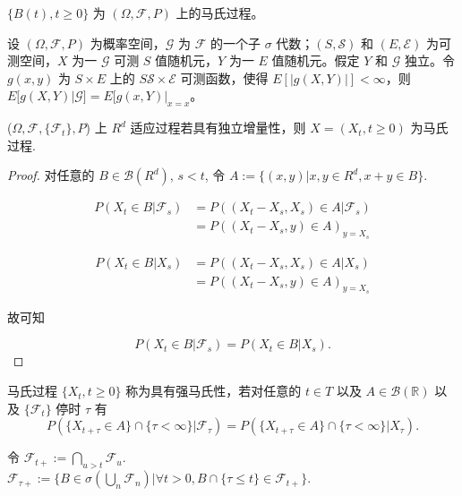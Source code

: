 \documentclass[lang=cn,10pt,thmcnt=section]{elegantbook}
\begin{document}
\begin{theorem}
	$\{B(t), t \geq 0\}$ 为 $(\Omega, \mathcal{F}, P)$ 上的马氏过程。
\end{theorem}
\begin{theorem}
	设 $(\Omega, \mathcal{F}, P)$ 为概率空间，$\mathcal{G}$ 为 $\mathcal{F}$ 的一个子 $\sigma$ 代数；$(S, \mathcal{S})$ 和 $(E, \mathcal{E})$ 为可测空间，$X$ 为一 $\mathcal{G}$ 可测 $S$ 值随机元，$Y$ 为一 $E$ 值随机元。假定 $Y$ 和 $\mathcal{G}$ 独立。令 $g(x, y)$ 为 $S \times E$ 上的 $S \mathcal{S} \times \mathcal{E}$ 可测函数，使得 $E[|g(X, Y)|] < \infty$，则 $E[g(X, Y) | \mathcal{G}] = E[g(x, Y)|_{x=x}$。
\end{theorem}
\begin{theorem}
	($\Omega, \mathcal{F}, \{\mathcal{F}_t\}, P$) 上 $R^d$ 适应过程若具有独立增量性，则 $X = (X_t, t \geq 0)$ 为马氏过程.
\end{theorem}
\begin{proof}
	对任意的 $B \in \mathcal{B}(R^d)$, $s < t$, 令 $A := \{(x, y) | x, y \in R^d, x + y \in B\}$.

\begin{align*}
P(X_t \in B | \mathcal{F}_s) &= P((X_t - X_s, X_s) \in A | \mathcal{F}_s) \\
&= P((X_t - X_s, y) \in A)_{y = X_s}
\end{align*}

\begin{align*}
P(X_t \in B | X_s) &= P((X_t - X_s, X_s) \in A | X_s) \\
&= P((X_t - X_s, y) \in A)_{y = X_s}
\end{align*}

故可知

\[ P(X_t \in B | \mathcal{F}_s) = P(X_t \in B | X_s). \]

\end{proof}
\begin{definition}
	马氏过程 $\{X_t, t \geq 0\}$ 称为具有强马氏性，若对任意的 $t \in T$ 以及 $A \in \mathcal{B}(\mathbb{R})$ 以及 $\{\mathcal{F}_t\}$ 停时 $\tau$ 有
\[ P(\{X_{t+\tau} \in A\} \cap \{\tau < \infty\} | \mathcal{F}_\tau) = P(\{X_{t+\tau} \in A\} \cap \{\tau < \infty\} | X_\tau). \]

\end{definition}

令 $\mathcal{F}_{t+} := \bigcap_{u > t} \mathcal{F}_u$.\\
$\mathcal{F}_{\tau+} := \{B \in \sigma(\bigcup_n \mathcal{F}_n) | \forall t > 0, B \cap \{\tau \leq t\} \in \mathcal{F}_{t+}\}$.
\end{document}

